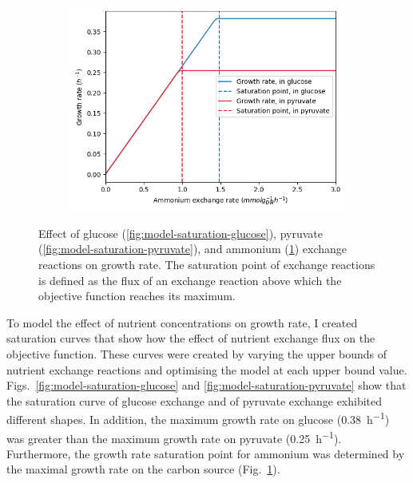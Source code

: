 \begin{figure}
  \begin{subfigure}[t]{0.45\textwidth}
  \centering
    \includegraphics[width=\linewidth]{saturation_amm}
    \caption{
    }
    \label{fig:model-saturation-ammonium}
  \end{subfigure}

  \caption{
    Effect of glucose (\ref{fig:model-saturation-glucose}), pyruvate (\ref{fig:model-saturation-pyruvate}), and ammonium (\ref{fig:model-saturation-ammonium}) exchange reactions on growth rate.
    The saturation point of exchange reactions is defined as the flux of an exchange reaction above which the objective function reaches its maximum.
  }
  \label{fig:model-saturation}
\end{figure}

To model the effect of nutrient concentrations on growth rate, I created saturation curves that show how the effect of nutrient exchange flux on the objective function.
These curves were created by varying the upper bounds of nutrient exchange reactions and optimising the model at each upper bound value.
Figs.\ \ref{fig:model-saturation-glucose} and \ref{fig:model-saturation-pyruvate} show that the saturation curve of glucose exchange and of pyruvate exchange exhibited different shapes.
In addition, the maximum growth rate on glucose (\SI{0.38}{\hour^{-1}}) was greater than the maximum growth rate on pyruvate (\SI{0.25}{\hour^{-1}}).
Furthermore, the growth rate saturation point for ammonium was determined by the maximal growth rate on the carbon source (Fig.\ \ref{fig:model-saturation-ammonium}).


